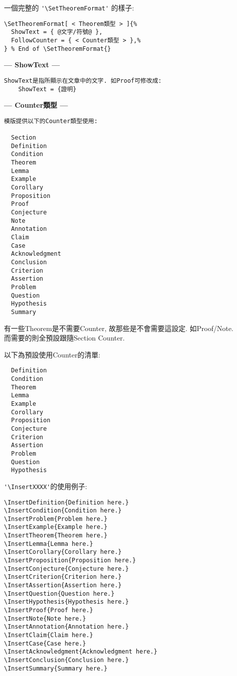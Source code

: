 \begin{enumerate}
{    一個完整的 \verb|'\SetTheoremFormat'| 的樣子:
    \begin{DescriptionFrame}
    \begin{verbatim}
\SetTheoremFormat[ < Theorem類型 > ]{%
  ShowText = { @文字/符號@ },
  FollowCounter = { < Counter類型 > },%
} % End of \SetTheoremFormat{}
    \end{verbatim}
    \end{DescriptionFrame}

    \textbf{--- ShowText ---}
    \begin{DescriptionFrame}
    \begin{verbatim}
ShowText是指所顯示在文章中的文字. 如Proof可修改成:
    ShowText = {證明}
    \end{verbatim}
    \end{DescriptionFrame}
  \newpage
    \textbf{--- Counter類型 ---}
    \begin{DescriptionFrame}
    \begin{verbatim}
模版提供以下的Counter類型使用:

  Section
  Definition
  Condition
  Theorem
  Lemma
  Example
  Corollary
  Proposition
  Proof
  Conjecture
  Note
  Annotation
  Claim
  Case
  Acknowledgment
  Conclusion
  Criterion
  Assertion
  Problem
  Question
  Hypothesis
  Summary
    \end{verbatim}
    \end{DescriptionFrame}

    \newpage
    有一些Theorem是不需要Counter, 故那些是不會需要這設定. 如Proof/Note.\\
    而需要的則全預設跟隨Section Counter.

    以下為預設使用Counter的清單:
    \begin{DescriptionFrame}
    \begin{verbatim}
  Definition
  Condition
  Theorem
  Lemma
  Example
  Corollary
  Proposition
  Conjecture
  Criterion
  Assertion
  Problem
  Question
  Hypothesis
    \end{verbatim}
    \end{DescriptionFrame}

  \newpage
    \verb|'\InsertXXXX'|的使用例子:
    \begin{DescriptionFrame}
    \begin{verbatim}
\InsertDefinition{Definition here.}
\InsertCondition{Condition here.}
\InsertProblem{Problem here.}
\InsertExample{Example here.}
\InsertTheorem{Theorem here.}
\InsertLemma{Lemma here.}
\InsertCorollary{Corollary here.}
\InsertProposition{Proposition here.}
\InsertConjecture{Conjecture here.}
\InsertCriterion{Criterion here.}
\InsertAssertion{Assertion here.}
\InsertQuestion{Question here.}
\InsertHypothesis{Hypothesis here.}
\InsertProof{Proof here.}
\InsertNote{Note here.}
\InsertAnnotation{Annotation here.}
\InsertClaim{Claim here.}
\InsertCase{Case here.}
\InsertAcknowledgment{Acknowledgment here.}
\InsertConclusion{Conclusion here.}
\InsertSummary{Summary here.}
    \end{verbatim}
    \end{DescriptionFrame}

}
\end{enumerate}

